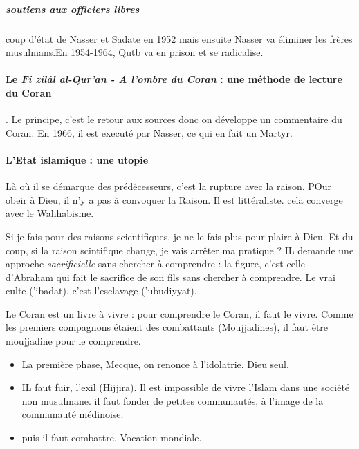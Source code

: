     \subparagraph{soutiens aux officiers libres} coup d'état de Nasser et Sadate en 1952 mais ensuite Nasser va éliminer les frères musulmans.En 1954-1964, Qutb va en prison et se radicalise.
   

   
    \paragraph{Le \emph{Fi zilâl al-Qur'an - \textit{A l'ombre du Coran}} : une méthode de lecture du Coran}. Le principe, c'est le retour aux sources donc on développe un commentaire du Coran. En 1966, il est executé par Nasser, ce qui en fait un Martyr.
   

   
   \paragraph{L'Etat islamique : une utopie} 
   
  \begin{Synthesis}
  Là où il se démarque des prédécesseurs, c'est la rupture avec la raison. POur obeir à Dieu, il n'y a pas à convoquer la Raison. Il est littéraliste. cela converge avec le Wahhabisme.
  \end{Synthesis}
  
  
  Si je fais pour des raisons scientifiques, je ne le fais plus pour plaire à Dieu. Et du coup, si la raison scintifique change, je vais arrêter ma pratique ? IL demande une approche \textit{sacrificielle} sans chercher à comprendre : la figure, c'est celle d'Abraham qui fait le sacrifice de son fils sans chercher à comprendre. Le vrai culte ('ibadat), c'est l'esclavage ('ubudiyyat).
  
  Le Coran est un livre à vivre : pour comprendre le Coran, il faut le vivre. Comme les premiers compagnons étaient des combattants (Moujjadines), il faut être moujjadine pour le comprendre.
  
  \begin{itemize}
      \item La première phase, Mecque, on renonce à l'idolatrie. Dieu seul. \item IL faut fuir, l'exil (Hijjira). Il est impossible de vivre l'Islam dans une société non musulmane. il faut fonder de petites communautés, à l'image de la communauté médinoise. 
      \item puis il faut combattre. Vocation mondiale. 
  \end{itemize}
  
